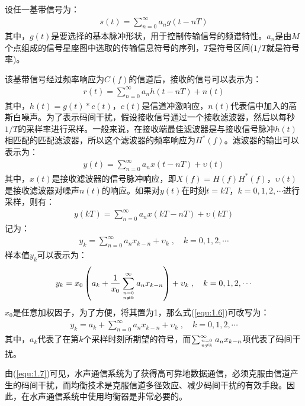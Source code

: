 设任一基带信号为：
\begin{eqnarray}
    s(t)=\sum_{n=0}^{\infty}a_ng(t-nT)
    \label{equ:1.1}
\end{eqnarray}
其中，$g(t)$是要选择的基本脉冲形状，用于控制传输信号的频谱特性。$a_n$是由$M$个点组成的信号星座图中选取的传输信息符号的序列，$T$是符号区间($1/T$就是符号率)。

该基带信号经过频率响应为$C(f)$的信道后，接收的信号可以表示为：
\begin{eqnarray}
    r(t)=\sum_{n=0}^{\infty}a_nh(t-nT)+n(t)
    \label{equ:1.2}
\end{eqnarray}
其中，$h(t)=g(t)*c(t)$，$c(t)$是信道冲激响应，$n(t)$代表信中加入的高斯白噪声。为了表示码间干扰，假设接收信号通过一个接收滤波器，然后以每秒$1/T$的采样率进行采样。一般来说，在接收端最佳滤波器是与接收信号脉冲$h(t)$相匹配的匹配滤波器，所以这个滤波器的频率响应为$H^*(f)$。滤波器的输出可以表示为：
\begin{eqnarray}
    y(t)=\sum_{n=0}^{\infty}a_nx(t-nT)+\upsilon(t)
    \label{equ:1.3}
\end{eqnarray}
其中，$x(t)$是接收滤波器的信号脉冲响应，即$X(f)=H(f)H^*(f)$，$\upsilon(t)$是接收滤波器对噪声$n(t)$的响应。如果对$y(t)$在时刻$t=kT$，$k=0,1,2,\cdots$进行采样，则有：
\begin{eqnarray}
    y(kT)=\sum_{n=0}^{\infty}a_nx(kT-nT)+\upsilon(kT)
    \label{equ:1.4}
\end{eqnarray}
记为：
\begin{eqnarray}
    y_k=\sum_{n=0}^{\infty}a_nx_{k-n}+\upsilon_k\;,\quad k=0,1,2,\cdots
    \label{equ:1.5}
\end{eqnarray}
样本值$y_k$可以表示为：
\begin{eqnarray}
    y_k=x_0\left(a_k+\frac{1}{x_0}\sum_{n=0 \atop n\neq
    k}^{\infty}a_nx_{k-n}\right)+\upsilon_k\;,\quad k=0,1,2,\cdots
    \label{equ:1.6}
\end{eqnarray}
$x_0$是任意加权因子，为了方便，将其置为1，那么式(\ref{equ:1.6})可改写为：
\begin{eqnarray}
    y_k=a_k+\sum_{n=0}^{\infty}a_nx_{k-n}+\upsilon_k\;,\quad k=0,1,2,\cdots
    \label{equ:1.7}
\end{eqnarray}
其中，$a_k$代表了在第$k$个采样时刻所期望的符号，而$\sum_{n=0\atop n\neq k}^{\infty}a_nx_{k-n}$项代表了码间干扰。

由(\ref{equ:1.7})可见，水声通信系统为了获得高可靠地数据通信，必须克服由信道产生的码间干扰，而均衡技术是克服信道多径效应、减少码间干扰的有效手段。因此，在水声通信系统中使用均衡器是非常必要的。
